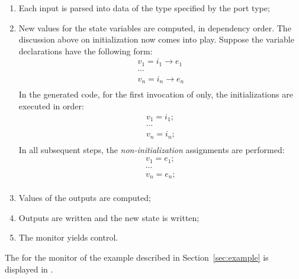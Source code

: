 \begin{enumerate}

\item Each input is parsed into data of the type specified by the port
  type;

\item New values for the state variables are computed, in dependency
  order. The discussion above on initialization now comes into
  play. Suppose the variable declarations have the following form:
\[
\begin{array}{l}
  v_1 = i_1 \longrightarrow e_1 \\
  \cdots \\
  v_n = i_n \longrightarrow e_n \\
\end{array}
\]
In the generated code, for the first invocation of  only,
the initializations are executed in order:
\[
\begin{array}{l}
  v_1 = i_1; \\
  \cdots \\
  v_n = i_n; \\
\end{array}
\]
In all subsequent steps, the \emph{non-initialization} assignments are performed:
\[
\begin{array}{l}
  v_1 = e_1; \\
  \cdots \\
  v_n = e_n; \\
\end{array}
\]

\item Values of the outputs are computed;

\item Outputs are written and the new state is written;

\item The monitor yields control.
\end{enumerate}

The  for the monitor of the example described in
Section~\ref{sec:example} is displayed in .

